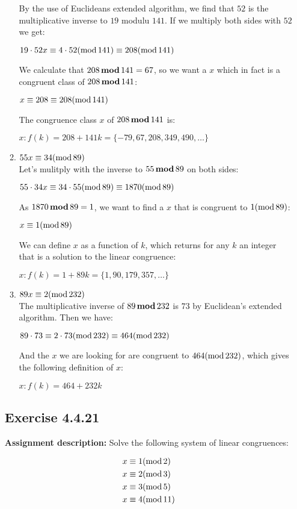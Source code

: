\documentclass{report}
\newcommand{\cent}[1]{\begin{center}#1\end{center}}
\newcommand{\mAlign}[1]{\begin{align*}#1\end{align*}}
\newcommand{\assignmentDescription}{\textbf{Assignment description: }}
\newcommand{\Exercise}[1]{\subsection{Exercise #1}}
\newcommand{\defaultEnumerateLabel}{\textbf{\alph*.}}
\newcommand{\modInline}{\text{mod\,}}
\newcommand{\modFunc}{\text{\,\textbf{mod}\,}}
\newcommand{\myItem}[1]{\item #1\\}
\begin{document}
\begin{enumerate}[label=\defaultEnumerateLabel]
\begin{enumerate}[label=\defaultEnumerateLabel]
		By the use of Euclideans extended algorithm, we find that $52$ is the multiplicative inverse to $19$ modulu $141$. If we multiply both sides with $52$ we get:
		
		\cent{$19 \cdot 52x \equiv 4 \cdot 52 (\modInline 141) \equiv 208 (\modInline 141)$}
		
		We calculate that $208 \modFunc 141 = 67$, so we want a $x$ which in fact is a congruent class of $208 \modFunc 141$:
		
		\cent{$x \equiv 208 \equiv 208 (\modInline 141)$}
		
		The congruence class $x$ of $208 \modFunc 141$ is:
		
		\cent{$x : f(k) = 208 + 141k = \{-79,67,208,349,490,\dots\}$}
		
		\myItem{$55x \equiv 34 (\modInline 89)$}
		
		Let's mulitply with the inverse to $55 \modFunc 89$ on both sides:
		
		\cent{$55 \cdot 34x \equiv 34 \cdot 55 (\modInline 89) \equiv 1870 (\modInline 89)$}
		
		As $1870 \modFunc 89 = 1$, we want to find a $x$ that is congruent to $1 (\modInline 89)$:
		
		\cent{$x \equiv 1 (\modInline 89)$}
		
		We can define $x$ as a function of $k$, which returns for any $k$ an integer that is a solution to the linear congruence:
		
		\cent{$x : f(k) = 1 +89k = \{1,90,179,357,\dots\}$}
		
		\myItem{$89x \equiv 2 (\modInline 232)$}
		
		The multiplicative inverse of $89 \modFunc 232$ is $73$ by Euclidean's extended algorithm. Then we have:
		
		\cent{$89 \cdot 73 \equiv 2 \cdot 73 (\modInline 232) \equiv 464 (\modInline 232)$}
		
		And the $x$ we are looking for are congruent to $ 464 (\modInline 232) $, which gives the following definition of $x$:
		
		\cent{$x :  f(k) = 464 + 232k$}
		
	\end{enumerate}
	\Exercise{4.4.21}
	
	\assignmentDescription
	Solve the following system of linear congruences:
	
	\mAlign{
		x &\equiv 1 (\modInline 2) \\
		x &\equiv 2 (\modInline 3) \\
		x &\equiv 3 (\modInline 5) \\
		x &\equiv 4 (\modInline 11)
	}
	

\end{enumerate}
\end{document}
